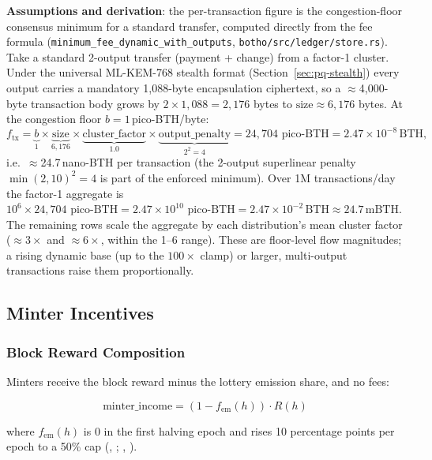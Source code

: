 \textbf{Assumptions and derivation}: the per-transaction figure is the
congestion-floor consensus minimum for a standard transfer, computed directly
from the fee formula (\texttt{minimum\_fee\_dynamic\_with\_outputs},
\texttt{botho/src/ledger/store.rs}). Take a standard 2-output transfer
(payment + change) from a factor-1 cluster. Under the universal ML-KEM-768
stealth format (Section~\ref{sec:pq-stealth}) every output carries a mandatory
1{,}088-byte encapsulation ciphertext, so a $\approx$4{,}000-byte transaction
body grows by $2\times1{,}088 = 2{,}176$ bytes to
$\text{size} \approx 6{,}176$ bytes. At the congestion floor
$b = 1$\,pico-BTH/byte:
\begin{equation}
f_{\text{tx}} = \underbrace{b}_{1} \times \underbrace{\text{size}}_{6{,}176}
  \times \underbrace{\text{cluster\_factor}}_{1.0}
  \times \underbrace{\text{output\_penalty}}_{2^{2} = 4}
  = 24{,}704 \text{ pico-BTH} = 2.47\times10^{-8}\,\text{BTH},
\end{equation}
i.e.\ $\approx$24.7\,nano-BTH per transaction (the 2-output superlinear penalty
$\min(2,10)^2 = 4$ is part of the enforced minimum). Over 1M
transactions/day the factor-1 aggregate is
$10^{6}\times24{,}704\text{ pico-BTH} = 2.47\times10^{10}\text{ pico-BTH}
 = 2.47\times10^{-2}\,\text{BTH} \approx 24.7\,\text{mBTH}$. The remaining rows scale
the aggregate by each distribution's mean cluster factor ($\approx3\times$ and
$\approx6\times$, within the 1--6 range). These are floor-level flow
magnitudes; a rising dynamic base (up to the $100\times$ clamp) or larger,
multi-output transactions raise them proportionally.

\subsection{Minter Incentives}

\subsubsection{Block Reward Composition}

Minters receive the block reward minus the lottery emission share, and no
fees:

\begin{equation}
\text{minter\_income} = (1 - f_{\text{em}}(h)) \cdot R(h)
\end{equation}

where $f_{\text{em}}(h)$ is 0 in the first halving epoch and rises 10
percentage points per epoch to a 50\% cap (,
; ,
).

